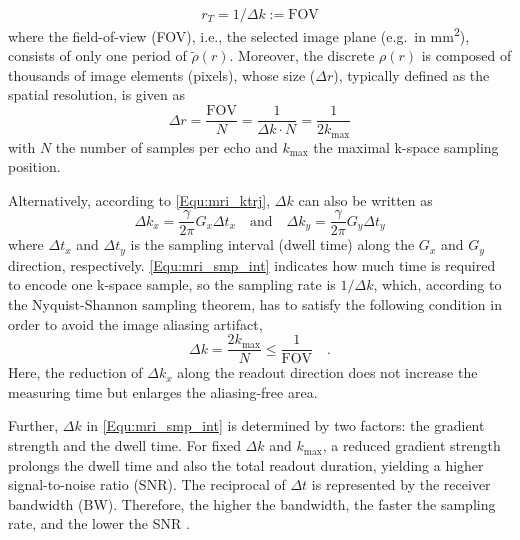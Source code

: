 \begin{equation} \label{Equ:mri_fov}
  r_T = 1 / \Delta k := \text{FOV}
\end{equation} 
where the field-of-view (\acs{FOV}), i.e., the selected image plane (e.g.~in \si{\square\mm}), consists of only one period of $\tilde{\rho}(r)$. Moreover, the discrete $\rho(r)$ is composed of thousands of image elements (pixels), whose size ($\Delta r$), typically defined as the spatial resolution, is given as
\begin{equation} \label{Equ:mri_pixel}
  \Delta r = \frac{\text{FOV}}{N} = \frac{1}{\Delta k \cdot N} = \frac{1}{2k_{\text{max}}}
\end{equation}
with $N$ the number of samples per echo and $k_{\text{max}}$ the maximal k-space sampling position. 

Alternatively, according to \cref{Equ:mri_ktrj}, $\Delta k$ can also be written as
\begin{equation} \label{Equ:mri_smp_int}
  \Delta k_x = \frac{\gamma}{2\pi} G_x \Delta t_x \quad \text{and} \quad \Delta k_y = \frac{\gamma}{2\pi} G_y \Delta t_y
\end{equation}
where $\Delta t_x$ and $\Delta t_y$ is the sampling interval (dwell time) along the $G_x$ and $G_y$ direction, respectively. \cref{Equ:mri_smp_int} indicates how much time is required to encode one k-space sample, so the sampling rate is $1 / \Delta k$, which, according to the Nyquist-Shannon sampling theorem, has to satisfy the following condition in order to avoid the image aliasing artifact,
\begin{equation}
  \Delta k = \frac{2 k_{\text{max}}}{N} \leq \frac{1}{\text{FOV}} \quad . 
\end{equation}
Here, the reduction of $\Delta k_x$ along the readout direction does not increase the measuring time but enlarges the aliasing-free area. 

Further, $\Delta k$ in \cref{Equ:mri_smp_int} is determined by two factors: the gradient strength and the dwell time. For fixed $\Delta k$ and $k_{\text{max}}$, a reduced gradient strength prolongs the dwell time and also the total readout duration, yielding a higher signal-to-noise ratio (SNR). The reciprocal of $\Delta t$ is represented by the receiver bandwidth (\acs{BW}). Therefore, the higher the bandwidth, the faster the sampling rate, and the lower the \acs{SNR} \cite{2009_Zhang_Thesis}. 


